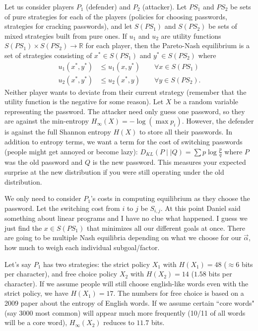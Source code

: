 \documentclass[12pt]{article}
\theoremstyle{remark}
\begin{document}
Let us consider players $P_1$ (defender) and $P_2$ (attacker). Let $PS_1$ and $PS_2$ be sets of pure strategies for each of the players (policies for choosing passwords, strategies for cracking passwords), and let $S(PS_1)$ and $S(PS_2)$ be sets of mixed strategies built from pure ones. If $u_1$ and $u_2$ are utility functions $S(PS_1)\times S(PS_2)\to\mathbb{R}$ for each player, then the Pareto-Nash equilibrium is a set of strategies consisting of $x^\ast \in S(PS_1)$ and $y^\ast \in S(PS_2)$ where
\begin{align*}
u_1(x^\ast, y^\ast)&\le u_1(x,y^\ast)\qquad \forall x\in S(PS_1) \\
u_2(x^\ast, y^\ast)&\le u_2(x^\ast,y)\qquad \forall y\in S(PS_2).
\end{align*}
Neither player wants to deviate from their current strategy (remember that the utility function is the negative for some reason). Let $X$ be a random variable representing the password. The attacker need only guess one password, so they are against the min-entropy $H_\infty (X) = -\log(\max p_i)$. However, the defender is against the full Shannon entropy $H(X)$ to store all their passwords. In addition to entropy terms, we want a term for the cost of switching passwords (people might get annoyed or become lazy): $D_{KL}(P\mid \mid Q) = \sum p \log \frac{p}{q}$ where $P$ was the old password and $Q$ is the new password. This measures your expected surprise at the new distribution if you were still operating under the old distribution.

We only need to consider $P_1$'s costs in computing equilibrium as they choose the password. Let the switching cost from $i$ to $j$ be $S_{i,j}$. At this point Daniel said something about linear programs and I have no clue what happened. I guess we just find the $x\in S(PS_1)$ that minimizes all our different goals at once. There are going to be multiple Nash equilibria depending on what we choose for our $\vec \alpha$, how much to weigh each individual subgoal/factor. 

Let's say $P_1$ has two strategies: the strict policy $X_1$ with $H(X_1)= 48$ ($\approx6$ bits per character), and free choice policy $X_2$ with $H(X_2) = 14$ ($1.58$ bits per character). If we assume people will still choose english-like words even with the strict policy, we have $H(X_1) = 17$. The numbers for free choice is based on a 2009 paper about the entropy of English words. If we assume certain ``core words" (say 3000 most common) will appear much more frequently (10/11 of all words will be a core word), $H_{\infty}(X_2)$ reduces to $11.7$ bits. 
\end{document}
